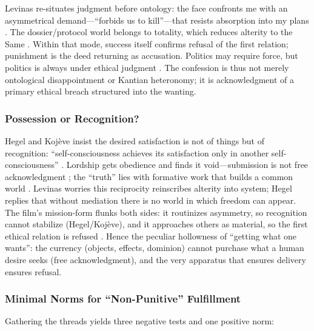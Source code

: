 Levinas re-situates judgment before ontology: the face confronts me with an asymmetrical
demand---``forbids us to kill''---that resists absorption into my plans \parencite[pp.~33,
199]{LevinasTI1969}. The dossier/protocol world belongs to totality, which reduces alterity to the
Same \parencite[pp.~21--24, 33--36]{LevinasTI1969}. Within that mode, success itself confirms
refusal of the first relation; punishment is the deed returning as accusation. Politics may require
force, but politics is always under ethical judgment \parencite[pp.~21--24,
215--219]{LevinasTI1969}. The confession is thus not merely ontological disappointment or Kantian
heteronomy; it is acknowledgment of a primary ethical breach structured into the wanting.

\subsubsection*{Possession or Recognition?}
\label{sssec:possession-or-recognition}

Hegel and Koj{\`e}ve insist the desired satisfaction is not of things but of recognition:
``self-consciousness achieves its satisfaction only in another self-consciousness''
\parencite[\S 175]{HegelPhenomenology1977}. Lordship gets obedience and finds it void---submission
is not free acknowledgment \parencite[\S\S 187--189]{HegelPhenomenology1977}; the ``truth'' lies
with formative work that builds a common world \parencite[\S 196]{HegelPhenomenology1977}. Levinas
worries this reciprocity reinscribes alterity into system; Hegel replies that without mediation
there is no world in which freedom can appear. The film's mission-form flunks both sides: it
routinizes asymmetry, so recognition cannot stabilize (Hegel/Koj{\`e}ve), and it approaches others
as material, so the first ethical relation is refused \parencite[pp.~21--24, 199]{LevinasTI1969}.
Hence the peculiar hollowness of ``getting what one wants'': the currency (objects, effects,
dominion) cannot purchase what a human desire seeks (free acknowledgment), and the very apparatus
that ensures delivery ensures refusal.

\subsubsection*{Minimal Norms for ``Non-Punitive'' Fulfillment}
\label{sssec:minimal-norms-for-non-punitive-fulfillment}

Gathering the threads yields three negative tests and one positive norm:

